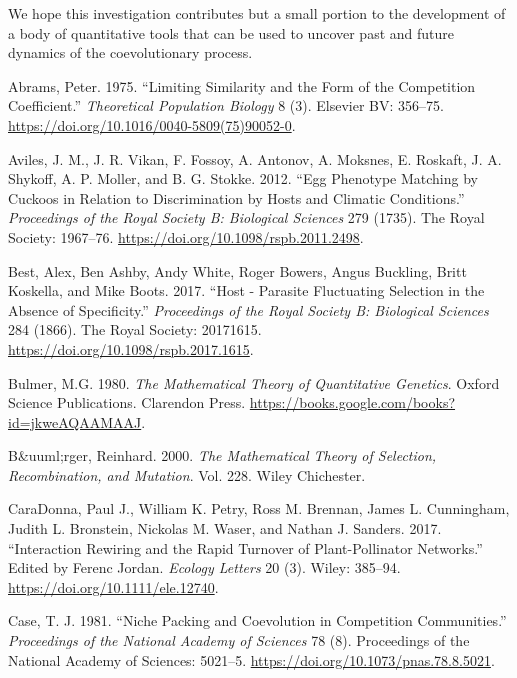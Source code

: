 \documentclass[]{article}
\begin{document}
We hope this investigation contributes but a small portion to the
development of a body of quantitative tools that can be used to uncover
past and future dynamics of the coevolutionary process.

\hypertarget{refs}{}
\leavevmode\hypertarget{ref-Abrams1975}{}%
Abrams, Peter. 1975. ``Limiting Similarity and the Form of the
Competition Coefficient.'' \emph{Theoretical Population Biology} 8 (3).
Elsevier BV: 356--75.
\url{https://doi.org/10.1016/0040-5809(75)90052-0}.

\leavevmode\hypertarget{ref-Aviles2012}{}%
Aviles, J. M., J. R. Vikan, F. Fossoy, A. Antonov, A. Moksnes, E.
Roskaft, J. A. Shykoff, A. P. Moller, and B. G. Stokke. 2012. ``Egg
Phenotype Matching by Cuckoos in Relation to Discrimination by Hosts and
Climatic Conditions.'' \emph{Proceedings of the Royal Society B:
Biological Sciences} 279 (1735). The Royal Society: 1967--76.
\url{https://doi.org/10.1098/rspb.2011.2498}.

\leavevmode\hypertarget{ref-Best2017}{}%
Best, Alex, Ben Ashby, Andy White, Roger Bowers, Angus Buckling, Britt
Koskella, and Mike Boots. 2017. ``Host - Parasite Fluctuating Selection
in the Absence of Specificity.'' \emph{Proceedings of the Royal Society
B: Biological Sciences} 284 (1866). The Royal Society: 20171615.
\url{https://doi.org/10.1098/rspb.2017.1615}.

\leavevmode\hypertarget{ref-bulmer1980mathematical}{}%
Bulmer, M.G. 1980. \emph{The Mathematical Theory of Quantitative
Genetics}. Oxford Science Publications. Clarendon Press.
\url{https://books.google.com/books?id=jkweAQAAMAAJ}.

\leavevmode\hypertarget{ref-burger2000mathematical}{}%
B\&uuml;rger, Reinhard. 2000. \emph{The Mathematical Theory of
Selection, Recombination, and Mutation}. Vol. 228. Wiley Chichester.

\leavevmode\hypertarget{ref-CaraDonna2017}{}%
CaraDonna, Paul J., William K. Petry, Ross M. Brennan, James L.
Cunningham, Judith L. Bronstein, Nickolas M. Waser, and Nathan J.
Sanders. 2017. ``Interaction Rewiring and the Rapid Turnover of
Plant-Pollinator Networks.'' Edited by Ferenc Jordan. \emph{Ecology
Letters} 20 (3). Wiley: 385--94.
\url{https://doi.org/10.1111/ele.12740}.

\leavevmode\hypertarget{ref-Case1981}{}%
Case, T. J. 1981. ``Niche Packing and Coevolution in Competition
Communities.'' \emph{Proceedings of the National Academy of Sciences} 78
(8). Proceedings of the National Academy of Sciences: 5021--5.
\url{https://doi.org/10.1073/pnas.78.8.5021}.
\end{document}
